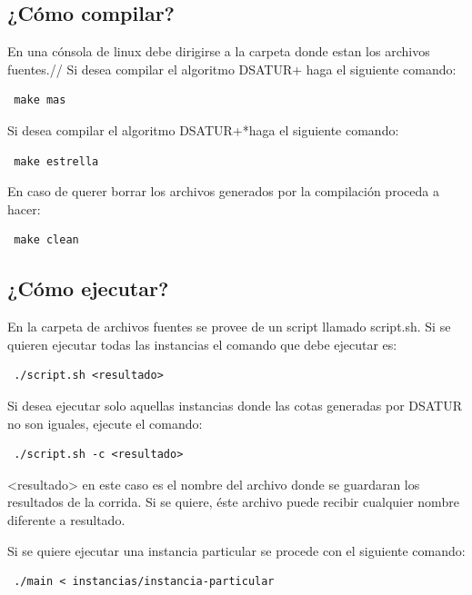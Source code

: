 \documentclass[a4paper,10pt]{article}
\begin{document}
\subsection{¿Cómo compilar?}
En una cónsola de linux debe dirigirse a la carpeta donde estan los
archivos fuentes.//
\indent Si desea compilar el algoritmo DSATUR+ haga el siguiente comando:
\begin{verbatim}
 make mas
\end{verbatim}

\indent Si desea compilar el algoritmo DSATUR+*haga el siguiente comando:
\begin{verbatim}
 make estrella
\end{verbatim}

En caso de querer borrar los archivos generados por la compilación
proceda a hacer:
\begin{verbatim}
 make clean
\end{verbatim}

\subsection{¿Cómo ejecutar?}
En la carpeta de archivos fuentes se provee de un script llamado
script.sh. Si se quieren ejecutar todas las instancias el comando que
debe ejecutar es:
\begin{verbatim}
 ./script.sh <resultado>
\end{verbatim}

Si desea ejecutar solo aquellas instancias donde las cotas generadas por
DSATUR no son iguales, ejecute el comando:
\begin{verbatim}
 ./script.sh -c <resultado>
\end{verbatim}

<resultado> en este caso es el nombre del archivo donde se guardaran los
resultados de la corrida. Si se quiere, éste archivo puede recibir
cualquier nombre diferente a resultado.

Si se quiere ejecutar una instancia particular se procede con el
siguiente comando:

\begin{verbatim}
 ./main < instancias/instancia-particular
\end{verbatim}

\newpage
\end{document}
